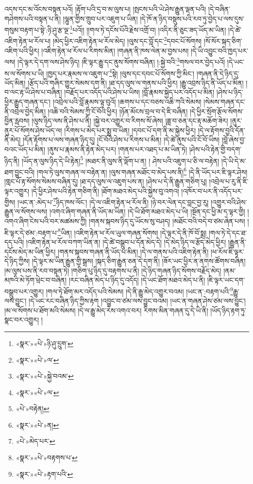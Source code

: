 འདས་དང་མ་འོངས་བསྟན་པའོ། །རྟོག་པའི་དྲ་བ་མ་ལུས་པ། །སྤངས་པའི་ཡེ་ཤེས་རྒྱུན་ལྡན་པའི། །དེ་བཞིན་གཤེགས་པའི་བསྟན་པ་ནི། །ལྷུན་གྱིས་གྲུབ་པར་འཇུག་པ་ཡིན། །དེ་ཁོ་ན་ཉིད་བསྡུས་པའི་རབ་ཏུ་བྱེད་པ་ལས་དུས་གསུམ་བརྟག་པ་སྟེ་:ཉི་ཤུ་རྩ་ལྔ་\footnote{«སྣར་»«པེ་»ཉི་ཤུ་དྲུག་}པའོ།། །།གལ་ཏེ་དངོས་པོའི་རྗེས་འགྲོ་བ། །འདིར་ནི་ཅུང་ཟད་ཡོད་མ་ཡིན། །དེ་ཚེ་འཇིག་རྟེན་ཕ་རོལ་པ། །མེད་ཕྱིར་འཇིག་རྟེན་ཕ་རོལ་མེད། །ལུས་དང་བློ་དང་\footnote{«སྣར་»«པེ་»ལ་}དབང་པོ་སོགས། །སོ་སོར་སྐད་ཅིག་འཇིག་པའི་ཕྱིར། །འཇིག་རྟེན་ཕ་རོལ་པ་རིགས་མིན། །གཞན་ནི་ཁས་ལེན་མ་བྱས་པས། །དེ་ཡི་འབྱུང་བའི་ཁྱད་པར་ལས། །དེ་ལྟར་དེ་དག་ལས་ཤེས་ཉིད། །ཇི་ལྟར་རྒྱུ་དང་ནུས་སོགས་བཞིན། །:སྐྱེ་བའི་\footnote{«སྣར་»«པེ་»སྐྱེ་བའམ་}གསལ་བར་བྱེད་པའོ། །དེ་ཡང་ས་ལ་སོགས་པ་ཡི། །ཁྱད་པར་རྣམས་ལ་འཇུག་པ་\footnote{«སྣར་»«པེ་»ལ་}སྟེ། །ལུས་དང་དབང་པོ་སོགས་ཀྱི་མིང་། །གཞན་ནི་དེ་ཉིད་དུ་ཡོད་མིན། །རྩོད་པའི་གཞིར་གྱུར་སེམས་དག་ནི། །ཐ་དད་ལུས་ལ་གནས་པའི་ཕྱིར། །རྒྱུ་འབྲས་ཉིད་ནི་ཡོད་པ་མིན། །བ་ལང་རྟ་ཡི་ཤེས་པ་བཞིན། །བརྗོད་པར་འདོད་པའི་ཤེས་པ་ཡིས། །བློ་རྣམས་སྐྱེད་པར་འདོད་པ་མིན། །ཤེས་པ་ཉིད་ཕྱིར་རྒྱུད་གཞན་དང་། །འབྲེལ་པའི་བློ་རྣམས་ལྟ་བུའོ། །ཆགས་པ་དང་བཅས་འཆི་ཀའི་སེམས། །སེམས་གཞན་དང་ནི་འབྲེལ་བྱེད་མིན། །འཆི་བའི་སེམས་ཀྱི་ངོ་བོའི་ཕྱིར། །ཉོན་མོངས་བྲལ་བ་དེ་ཇི་བཞིན། །དེ་ཕྱིར་སྲོག་རྩོལ་སོགས་བྱིན་རླབས། །ལུས་ཉིད་ལས་ནི་ཤེས་པ་ནི། །སྐྱེ་བར་འགྱུར་བ་རིགས་སོ་ཞེས། །ཟླ་བ་ཅན་དང་རྟ་མཆོག་ཟེར། །ནུར་ནུར་པོ་སོགས་ཤེས་ཡོད་ལ། །རིགས་པ་མེད་པར་སྨྲ་བ་ཡིན། །དབང་པོ་དག་ནི་མ་སྐྱེས་ཕྱིར། །དེ་ལ་རྟོགས་བྱའི་དོན་ནི་མེད། །དོན་རྟོགས་པ་ལས་གཞན་ཉིད་དུ། །ངོ་བོའི་ཤེས་པ་རིགས་པ་མིན། །དེ་ཚེ་ནུས་པའི་ངོ་བོ་ཡིས། །བློ་ཞེས་བྱ་བའང་ཡོད་པ་མིན། །ནུས་པ་རྣམས་ནི་རྟེན་མེད་པར། །གནས་པར་འཐད་པ་མ་ཡིན་ཏེ། །ཤེས་པའི་རྟེན་གྱི་བདག་ཉིད་ནི། །ཡོད་ན་ལུས་ཉིད་དེ་ཡི་རྟེན།\footnote{«པེ་»བརྟེན།} །མཐར་ནི་ལུས་ནི་ལྡོག་པ་ན། །
ཤེས་པའི་འཇུག་པ་ཅི་ལ་བརྟེན། །དེ་ཡི་དེ་མ་ཐག་བྱུང་བའི། །གལ་ཏེ་ལུས་གཞན་ལ་བརྟེན་ན། །ལུས་གཞན་མཐོང་བ་མེད་པས་ནི།\footnote{«སྣར་»«པེ་»ན།} །དེ་ནི་ཡོད་པར་ཇི་ལྟར་ཤེས། །གླང་པོ་རྟ་སོགས་སེམས་བཞིན་དུ། །ཐ་དད་ལུས་ལ་འཇུག་པས་ན། །ཤེས་པ་དེ་ནི་རྒྱུན་གཅིག་པུ། །འབྲེལ་པ་རུ་ནི་ཇི་ལྟར་འགྱུར། །དེ་ཕྱིར་ཤེས་པའི་རྟེན་གཅིག་ནི། །ཐོག་མཐའ་མེད་པའི་སྐྱེས་བུ་འགའ། །འཁོར་བ་པར་ནི་འདོད་པར་གྱིས། །ཡང་ན་:མེད་པ་\footnote{«པེ་»མེད་པར་}ཉིད་ཁས་ལོང་། །དེ་ལ་འཇིག་རྟེན་ཕ་རོལ་ནི། །ཉེ་བར་ལེན་དང་བླང་བྱ་རུ། །འགྱུར་བའི་ཤེས་རྒྱུན་ལ་སོགས་ལས། །འགའ་ཞིག་གཞན་ནི་ཡོད་མ་ཡིན། །དེ་ཡི་ཐོག་མཐའ་མེད་པ་ཡི། །སྔོན་དང་ཕྱི་མ་ད་ལྟར་གྱི། །འགའ་ཞིག་ངེས་པའི་བར་མཚམས་ཀྱི། །གནས་སྐབས་ཉིད་དུ་ཡོངས་སུ་བཤད། །མཐོང་བའི་བདེ་བ་ཙམ་ཞེན་པས། །ཇི་ལྟར་དེ་ཙམ་:བརྟག་པ་\footnote{«སྣར་»«པེ་»བརྟགས་པ་}ཡིན། །འཇིག་རྟེན་ཕ་རོལ་ཡུལ་གཞན་སོགས། །དེ་ལྟར་དེ་ནི་ཁོ་བོ་སྨྲ། །གལ་ཏེ་དེ་དང་ཐ་དད་པའི། །འཇིག་རྟེན་ཕ་རོལ་བཀག་ཡིན་ན། །དེ་ཚེ་བསྒྲུབ་པ་དོན་མེད་དེ། །དེ་མེད་ཉིད་ལ་རྩོད་མེད་ཕྱིར། །རྒྱུན་ནི་དངོས་མེད་མ་ཡིན་ཕྱིར། །གནས་སྐབས་གཞན་ནི་ཡོད་པ་མིན། །དེ་ལ་གནས་པའི་འཇིག་རྟེན་ནི། །ཕ་རོལ་ཇི་ལྟར་དེ་ཉིད་ཀྱིས། །དེ་ལྟར་མ་ཡིན་རྒྱུན་གྱི་སྒྲས། །སྐད་ཅིག་རྒྱུན་ཅན་དེ་དག་ནི། །ཟོར་ཡང་ཕྱིར་ན་ནགས་ཚོགས་བཞིན། །མ་ལུས་པས་ནི་རབ་བསྟན་ཏེ། །གཅིག་པུ་ཉིད་དུ་བརྟགས་པ་ནི། །དེ་ཉིད་གཞན་ཉིད་སོགས་བརྗོད་མེད། །ནམ་མཁའི་མེ་ཏོག་ཕྲེང་བ་བཞིན། །རང་བཞིན་མེད་པ་ཉིད་དུ་འདོད། །དེ་ཡང་ཐོག་མཐའ་མེད་པ་ནི། །ཇི་ལྟར་ཡང་དག་བསྒྲུབ་པར་འགྱུར། །གལ་ཏེ་ཐོག་མར་འདོད་པའི་སེམས། །དེ་ནི་རྒྱུ་མེད་འགྱུར་བའམ། །ཡང་ན་:བརྟག་པའི་\footnote{«སྣར་»«པེ་»རྟག་པའི་}རྒྱུ་ལས་བྱུང་། །དེ་ཡང་རང་བཞིན་ཉིད་ཀྱིས་རྟག །འབྱུང་བ་ཙམ་ལས་བྱུང་བའམ། །ཡང་ན་གཞན་ཤེས་ཙམ་ལས་བྱུང་། །མ་ལ་སོགས་པ་ཐོག་མའི་སེམས། །དེ་ལ་རྒྱུ་མེད་རེས་འགའ་བར། རིགས་མིན་གཞན་དུ་དེ་ཡི་ནི། །ཡོད་ཉིད་རྟག་ཏུ་སྣང་བར་འགྱུར། །
